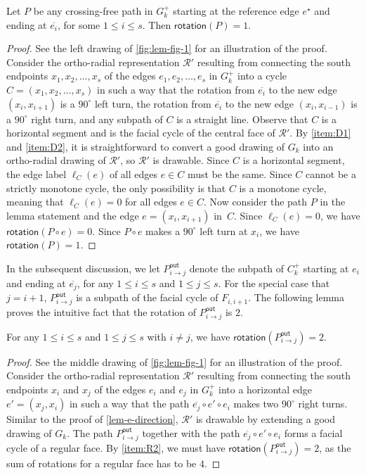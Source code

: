 \documentclass{article}\usepackage[a4paper,margin=20mm]{geometry}
\newcommand{\Pout}{P^{\mathsf{out}}}
\newcommand{\RR}{\mathcal{R}}
\newcommand{\rotation}{\mathsf{rotation}}
\newcommand{\eref}{e^\star}
\begin{document}
\begin{lemma}\label{lem-e-direction}
Let $P$ be any crossing-free path in $G_k^+$ starting at the reference edge $\eref$ and ending at $\overline{e_i}$, for some $1 \leq i \leq s$. Then $\rotation(P) = 1$. 
\end{lemma}
\begin{proof}
See the left drawing of \cref{fig:lem-fig-1} for an illustration of the proof.
 Consider the ortho-radial representation $\RR'$ resulting from connecting the south endpoints $x_1, x_2, \ldots, x_s$ of the edges $e_1, e_2, \ldots, e_s$ in $G_k^+$ into a cycle $C = (x_1, x_2, \ldots, x_s)$ in such a way that the rotation from $\overline{e_i}$ to the new edge $(x_i, x_{i+1})$ is a $90^\circ$ left turn,   the rotation from $\overline{e_i}$ to the new edge $(x_i, x_{i-1})$ is a $90^\circ$ right turn, and any subpath of $C$ is a straight line.
 Observe that $C$ is a horizontal segment and is the facial cycle of the central face of $\RR'$. By \ref{item:D1} and \ref{item:D2}, it is straightforward to convert a good drawing of $G_k$ into an ortho-radial drawing of $\RR'$, so $\RR'$ is drawable. Since $C$ is a horizontal segment, the edge label  $\ell_C(e)$ of all edges $e \in C$  must be the same. Since $C$ cannot be a strictly monotone cycle, the only possibility is that $C$ is a monotone cycle, meaning that $\ell_C(e) = 0$ for all edges $e \in C$.  Now consider the path $P$ in the lemma statement and the edge $e=(x_i, x_{i+1})$ in~$C$.
 Since $\ell_C(e) = 0$, we  have $\rotation(P \circ e) = 0$. Since $P \circ e$ makes a $90^\circ$ left turn at $x_i$, we have $\rotation(P) = 1$. 
\end{proof}


In the subsequent discussion, we let $\Pout_{i\rightarrow j}$ denote the subpath of $C_k^+$ starting at $e_i$ and ending at $\overline{e_j}$, for any  $1 \leq i \leq s$ and $1 \leq j \leq s$.  For the special case that $j=i+1$, $\Pout_{i\rightarrow j}$ is a subpath of the facial cycle of $F_{i,i+1}$.  The following lemma proves the intuitive fact that the rotation of 
$\Pout_{i\rightarrow j}$ is $2$.

\begin{lemma}\label{lem-rotation-aux}
For any $1 \leq i \leq s$ and $1 \leq j \leq s$ with $i \neq j$, we have $\rotation(\Pout_{i\rightarrow j}) = 2$.
\end{lemma}
\begin{proof}
See the middle drawing of \cref{fig:lem-fig-1} for an illustration of the proof.
 Consider the ortho-radial representation $\RR'$ resulting from connecting the south endpoints $x_i$ and $x_j$ of the edges $e_i$ and  $e_j$ in $G_k^+$ into a horizontal edge $e'=(x_j, x_i)$ in such a way that the path $\overline{e_j} \circ e' \circ e_i$ makes two $90^\circ$ right turns. Similar to the proof of  \cref{lem-e-direction}, $\RR'$ is drawable by extending a good drawing of $G_k$.
 The path $\Pout_{i\rightarrow j}$ together with the path $\overline{e_j} \circ e' \circ e_i$ forms a facial cycle  of a regular face. By \ref{item:R2}, we must have $\rotation(\Pout_{i\rightarrow j}) = 2$, as the sum of rotations for a regular face has to be $4$. 
\end{proof}
\end{document}
